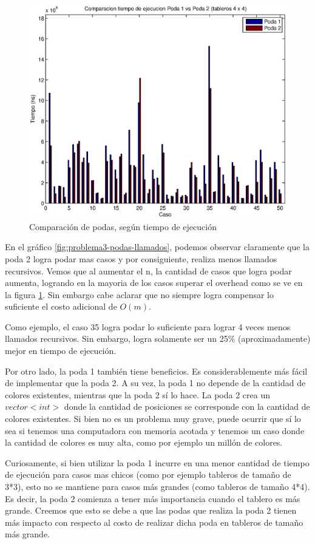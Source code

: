 \begin{center}
  \begin{figure}[H]
\includegraphics[width=\linewidth]{problema3/graficos/comparacion_podas1y2_tiempo.eps}
    \caption{Comparación de podas, según tiempo de ejecución}
    \label{fig:problema3-podas-tiempo}
  \end{figure}
\end{center}


En el gráfico \ref{fig:problema3-podas-llamados}, podemos observar claramente que la poda 2 logra podar mas casos y por consiguiente, realiza menos llamados recursivos. Vemos que al aumentar el n, la cantidad de casos que logra podar aumenta, logrando en la mayoria de los casos superar el overhead como se ve en la figura \ref{fig:problema3-podas-tiempo}. Sin embargo cabe aclarar que no siempre logra compensar lo suficiente el costo adicional de $O(m)$.

Como ejemplo, el caso 35 logra podar lo suficiente para lograr 4 veces menos llamados recursivos. Sin embargo, logra solamente ser un 25\% (aproximadamente) mejor en tiempo de ejecución.

Por otro lado, la poda 1 también tiene beneficios. Es considerablemente más fácil de implementar que la poda 2. A su vez, la poda 1 no depende de la cantidad de colores existentes, mientras que la poda 2 sí lo hace. La poda 2 crea un $vector<int>$ donde la cantidad de posiciones se corresponde con la cantidad de colores existentes. Si bien no es un problema muy grave, puede ocurrir que sí lo sea si tenemos una computadora con memoria acotada y tenemos un caso donde la cantidad de colores es muy alta, como por ejemplo un millón de colores.

Curiosamente, si bien utilizar la poda 1 incurre en una menor cantidad de tiempo de ejecución para casos mas chicos (como por ejemplo tableros de tamaño de 3*3), esto no se mantiene para casos más grandes (como tableros de tamaño 4*4). Es decir, la poda 2 comienza a tener más importancia cuando el tablero es más grande. Creemos que esto se debe a que las podas que realiza la poda 2 tienen más impacto con respecto al costo de realizar dicha poda en tableros de tamaño más grande.